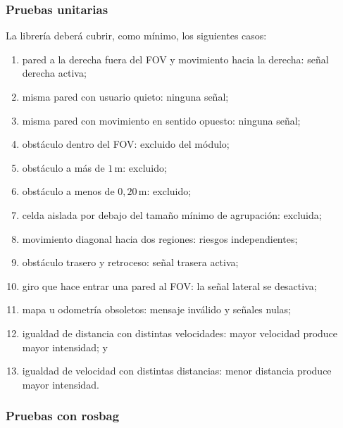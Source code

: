 \subsubsection{Pruebas unitarias}

La librería deberá cubrir, como mínimo, los siguientes casos:
%
\begin{enumerate}
  \item pared a la derecha fuera del FOV y movimiento hacia la derecha:
    señal derecha activa;
  \item misma pared con usuario quieto: ninguna señal;
  \item misma pared con movimiento en sentido opuesto: ninguna señal;
  \item obstáculo dentro del FOV: excluido del módulo;
  \item obstáculo a más de $1\,\text{m}$: excluido;
  \item obstáculo a menos de $0{,}20\,\text{m}$: excluido;
  \item celda aislada por debajo del tamaño mínimo de agrupación: excluida;
  \item movimiento diagonal hacia dos regiones: riesgos independientes;
  \item obstáculo trasero y retroceso: señal trasera activa;
  \item giro que hace entrar una pared al FOV: la señal lateral se desactiva;
  \item mapa u odometría obsoletos: mensaje inválido y señales nulas;
  \item igualdad de distancia con distintas velocidades: mayor velocidad
    produce mayor intensidad; y
  \item igualdad de velocidad con distintas distancias: menor distancia
    produce mayor intensidad.
\end{enumerate}

\subsubsection{Pruebas con rosbag}

